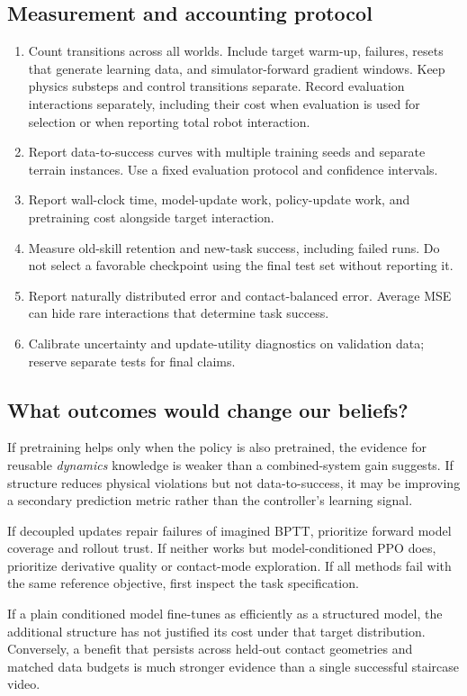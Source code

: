 \subsection{Measurement and accounting protocol}
\begin{enumerate}
\item Count transitions across all worlds. Include target warm-up, failures,
resets that generate learning data, and simulator-forward gradient windows.
Keep physics substeps and control transitions separate.
Record evaluation interactions separately, including their cost when evaluation
is used for selection or when reporting total robot interaction.
\item Report data-to-success curves with multiple training seeds and separate
terrain instances. Use a fixed evaluation protocol and confidence intervals.
\item Report wall-clock time, model-update work, policy-update work, and
pretraining cost alongside target interaction.
\item Measure old-skill retention and new-task success, including failed runs.
Do not select a favorable checkpoint using the final test set without reporting it.
\item Report naturally distributed error and contact-balanced error. Average
MSE can hide rare interactions that determine task success.
\item Calibrate uncertainty and update-utility diagnostics on validation data;
reserve separate tests for final claims.
\end{enumerate}

\subsection{What outcomes would change our beliefs?}
If pretraining helps only when the policy is also pretrained, the evidence for
reusable \emph{dynamics} knowledge is weaker than a combined-system gain suggests.
If structure reduces physical violations but not data-to-success, it may be
improving a secondary prediction metric rather than the controller's learning signal.

If decoupled updates repair failures of imagined BPTT, prioritize forward model
coverage and rollout trust. If neither works but model-conditioned PPO does,
prioritize derivative quality or contact-mode exploration. If all methods fail
with the same reference objective, first inspect the task specification.

If a plain conditioned model fine-tunes as efficiently as a structured model,
the additional structure has not justified its cost under that target distribution.
Conversely, a benefit that persists across held-out contact geometries and matched
data budgets is much stronger evidence than a single successful staircase video.
